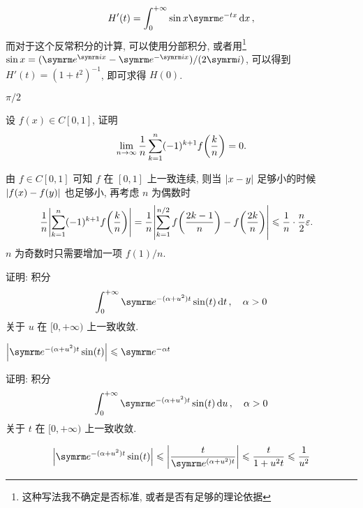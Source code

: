\documentclass{ctexart}
\begin{document}
\begin{exercise}[series=exer]
\begin{hint}
        \begin{align*}
            H'(t) = \int_{0}^{+\infty} \sin x\me^{-tx} \dd{x},
        \end{align*}
        而对于这个反常积分的计算, 可以使用分部积分, 或者用\footnote{这种写法我不确定是否标准, 或者是否有足够的理论依据} $ \sin x = (\me^{\mi x} - \me^{-\mi x})/(2\mi) $, 可以得到 $ H'(t) = (1 + t^{2})^{-1} $, 即可求得 $ H(0) $. 
    \end{hint}
    \begin{answer}
        $ \pi/2 $ 
    \end{answer}
    \item 设 $ f(x) \in C[0, 1] $, 证明
    \begin{align*}
        \lim_{n \to \infty} \frac{1}{n} \sum_{k=1}^{n} (-1)^{k+1} f\qty(\frac{k}{n}) = 0.
    \end{align*}
    \begin{hint}
        由 $ f \in C[0, 1] $ 可知 $ f $ 在 $ [0, 1] $ 上一致连续, 则当 $ \abs{x - y} $ 足够小的时候 $ \abs{f(x) - f(y)} $ 也足够小, 再考虑 $ n $ 为偶数时
        \begin{align*}
            \frac{1}{n} \abs{\sum_{k=1}^{n} (-1)^{k+1} f\qty(\frac{k}{n})} & = \frac{1}{n}\abs{\sum_{k = 1}^{n/2}f\qty(\frac{2k-1}{n}) - f\qty(\frac{2k}{n})} \leqslant \frac{1}{n}\cdot\frac{n}{2}\varepsilon.
        \end{align*}
        $ n $ 为奇数时只需要增加一项 $ f(1)/n $.
    \end{hint}
    \item 证明: 积分 
    \begin{align*}
        \int_{0}^{+\infty} \me^{-(\alpha + u^{2})t} \sin(t) \dd{t},\quad \alpha > 0
    \end{align*}
    关于 $ u $ 在 $ [0, +\infty) $ 上一致收敛.    
    \begin{hint}
        $ \abs{\me^{-(\alpha + u^{2})t} \sin(t)} \le \me^{-\alpha t} $ 
    \end{hint}
    \item 证明: 积分 
    \begin{align*}
        \int_{0}^{+\infty} \me^{-(\alpha + u^{2})t} \sin(t) \dd{u},\quad \alpha > 0
    \end{align*}
    关于 $ t $ 在 $ [0, +\infty) $ 上一致收敛.
    \begin{hint}
        \begin{align*}
            \abs{\me^{-(\alpha + u^{2})t} \sin(t)} \le \abs{\frac{t}{\me^{(\alpha + u^{2})t}}} \le \frac{t}{1 + u^{2}t} \le \frac{1}{u^{2}}
        \end{align*}

\end{hint}
\end{exercise}
\end{document}
